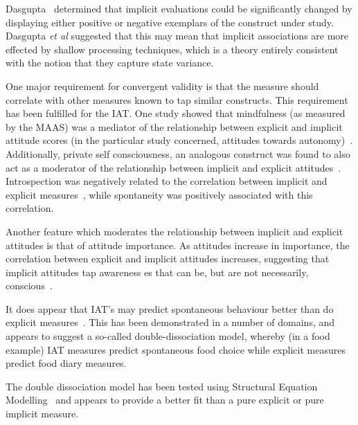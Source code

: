 Dasgupta~\cite{Dasgupta2001} determined that implicit evaluations could be significantly changed by displaying either positive or negative exemplars of the construct under study. Dasgupta \textit{et al} suggested that this may mean that implicit associations are more effected by shallow processing techniques, which is a theory entirely consistent with the notion that they capture state variance. 

One major requirement for convergent validity is that the measure should correlate with other measures known to tap similar constructs. This requirement has been fulfilled for the IAT. One study showed that mindfulness (as measured by the MAAS) was a mediator of the relationship between explicit and implicit attitude scores (in the particular study concerned, attitudes towards autonomy)~\cite{Levesque2007}. Additionally, private self consciousness, an analogous construct was found to also act as a moderator of the relationship between implicit and explicit attitudes~\cite{Gschwendner2006}. Introspection was negatively related to the correlation between implicit and explicit measures~\cite{Hofmann2005}, while spontaneity was positively associated with this correlation. 

Another feature which moderates the relationship between implicit and explicit attitudes is that of attitude importance. As attitudes increase in importance, the correlation between explicit and implicit attitudes increases, suggesting that implicit attitudes tap awareness es that can be, but are not necessarily, conscious~\cite{Karpinski2005}. 


It does appear that IAT's may predict spontaneous behaviour better than do explicit measures~\cite{Asendorpf2002,Richetin2007,Perugini2005}. This has been demonstrated in a number of domains, and appears to suggest a so-called double-dissociation model, whereby (in a food example) IAT measures predict spontaneous food choice while explicit measures predict food diary measures. 

The double dissociation model has been tested using Structural Equation Modelling~\cite{Nosek2007a,Perugini2005} and appears to provide a better fit than a pure explicit or pure implicit measure. %

